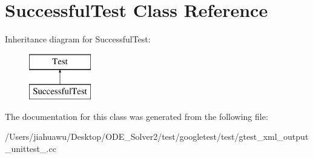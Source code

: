\hypertarget{class_successful_test}{}\section{Successful\+Test Class Reference}
\label{class_successful_test}
Inheritance diagram for Successful\+Test\+:\begin{figure}[H]
\begin{center}
\leavevmode
\includegraphics[height=2.000000cm]{class_successful_test}
\end{center}
\end{figure}


The documentation for this class was generated from the following file\+:\begin{DoxyCompactItemize}
\item 
/\+Users/jiahuawu/\+Desktop/\+O\+D\+E\+\_\+\+Solver2/test/googletest/test/gtest\+\_\+xml\+\_\+output\+\_\+unittest\+\_\+.\+cc\end{DoxyCompactItemize}
